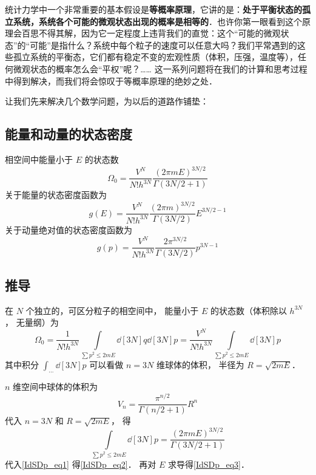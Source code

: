 
\begin{issues}
\issueDraft
\end{issues}


统计力学中一个非常重要的基本假设是\textbf{等概率原理}，它讲的是：\textbf{处于平衡状态的孤立系统，系统各个可能的微观状态出现的概率是相等的}．也许你第一眼看到这个原理会百思不得其解，因为它一定程度上违背我们的直觉：这个“可能的微观状态”的“可能”是指什么？系统中每个粒子的速度可以任意大吗？我们平常遇到的这些孤立系统的平衡态，它们都有稳定不变的宏观性质（体积，压强，温度等），任何微观状态的概率怎么会“平权”呢？…… 这一系列问题将在我们的计算和思考过程中得到解决，而我们将会惊叹于等概率原理的绝妙之处．

让我们先来解决几个数学问题，为以后的道路作铺垫：
\subsection{能量和动量的状态密度}
相空间中能量小于 $E$ 的状态数
\begin{equation}\label{IdSDp_eq2}
\Omega_0 = \frac{V^N}{N! h^{3N}} \frac{(2\pi mE)^{3N/2}}{\Gamma(3N/2+1)}
\end{equation}
关于能量的状态密度函数为
\begin{equation}\label{IdSDp_eq3}
g(E) = \frac{V^N}{N! h^{3N}} \frac{(2\pi m)^{3N/2}}{\Gamma(3N/2)} E^{3N/2 - 1}
\end{equation}
关于动量绝对值的状态密度函数为
\begin{equation}\label{IdSDp_eq4}
g(p) = \frac{V^N}{N! h^{3N}} \frac{2\pi^{3N/2}}{\Gamma(3N/2)} p^{3N - 1}
\end{equation}


\subsection{推导}
在 $N$ 个独立的，可区分粒子的相空间中， 能量小于 $E$ 的状态数（体积除以 $h^{3N}$， 无量纲）为
\begin{equation}\label{IdSDp_eq1}
\Omega_0 = \frac{1}{N! h^{3N}} \int\limits_{\sum p^2 \leqslant 2mE} \dd[3N]{q} \dd[3N]{p} = \frac{V^N}{N! h^{3N}} \int\limits_{\sum p^2 \leqslant 2mE} \dd[3N]{p}
\end{equation}
其中积分 $\int_{\dots} \dd[3N]{p} $ 可以看做 $n=3N$ 维球体的体积， 半径为 $R = \sqrt{2mE}$． 

$n$ 维空间中球体的体积为
\begin{equation}
V_n = \frac{\pi^{n/2}}{\Gamma(n/2+1)}R^n
\end{equation}
代入 $n=3N$ 和 $R = \sqrt{2mE} $， 得
\begin{equation}
\int\limits_{\sum p^2 \leqslant 2mE} \dd[3N]{p} = \frac{(2\pi mE)^{3N/2}}{\Gamma(3N/2+1)}
\end{equation}
代入\autoref{IdSDp_eq1} 得\autoref{IdSDp_eq2}． 再对 $E$ 求导得\autoref{IdSDp_eq3}．
